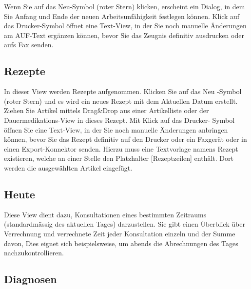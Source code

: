 Wenn Sie auf das \glqq Neu\grqq -Symbol (roter Stern) klicken, erscheint ein
Dialog, in dem Sie Anfang und Ende der neuen Arbeitsunfähigkeit festlegen
können. Klick auf das \glqq Drucker\grqq -Symbol öffnet eine Text-View, in der
Sie noch manuelle Änderungen am AUF-Text ergänzen können, bevor Sie das Zeugnis
definitiv ausdrucken oder aufs Fax senden.

\subsection{Rezepte}
In dieser View werden Rezepte aufgenommen. Klicken Sie auf das \glqq Neu\grqq
-Symbol (roter Stern) und es wird ein neues Rezept mit dem Aktuellen Datum
erstellt. Ziehen Sie Artikel mittels Drag\&Drop aus einer Artikelliste oder der
Dauermedikations-View in dieses Rezept. Mit Klick auf das \glqq Drucker\grqq -
Symbol öffnen Sie eine Text-View, in der Sie noch manuelle Änderungen anbringen
können, bevor Sie das Rezept definitiv auf den Drucker oder ein Faxgerät oder in
einen Export-Konnektor senden.
Hierzu muss eine Textvorlage namens \glqq Rezept\grqq
existieren, welche an einer Stelle den Platzhalter [Rezeptzeilen] enthält. Dort
werden die ausgewählten Artikel eingefügt.

\subsection{Heute}
Diese View dient dazu, Konsultationen eines bestimmten Zeitraums (standardmässig
des aktuellen Tages) darzustellen. Sie gibt einen Überblick über Verrechnung und
verrechnete Zeit jeder Konsultation einzeln und der Summe davon, Dies eignet
sich beispielsweise, um abends die Abrechnungen des Tages nachzukontrollieren.


\subsection{Diagnosen}

